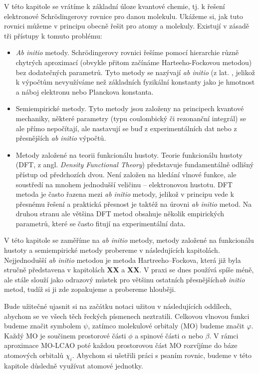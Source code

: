 V této kapitole se vrátíme k základní úloze kvantové chemie, tj. k řešení elektronové Schr\"{o}dingerovy rovnice pro danou molekulu. Ukážeme si, jak tuto rovnici můžeme v principu obecně řešit pro atomy a molekuly.  Existují v zásadě tři přístupy k tomuto problému:

\begin{itemize}

\item \textit{Ab initio} metody.  Schr\"{o}dingerovy  rovnici řešíme pomocí hierarchie různě chytrých aproximací (obvykle přitom začínáme Harteeho-Fockovou metodou) bez dodatečných parametrů. Tyto metody se nazývají \textit{ab initio} (z lat. , jelikož k výpočtům nevyužíváme než základních fyzikální konstanty jako je hmotnost a náboj elektronu nebo Planckova konstanta. 

\item Semiempirické metody. Tyto metody jsou založeny na principech kvantové mechaniky, některé parametry (typu coulombický či rezonanční integrál) se ale přímo nepočítají, ale nastavují se buď z experimentálních dat nebo z přesnějších \textit{ab initio} výpočtů.

\item Metody založené na teorii funkcionálu hustoty.  Teorie funkcionálu hustoty (DFT, z angl. \textit{Density Functional Theory}) představuje fundamentálně odlišný přístup od předchozích dvou. Není založen na hledání vlnové funkce, ale soustředí na mnohem jednodušší veličinu -- elektronovou hustotu. DFT metoda je často řazena mezi \textit{ab initio} metody, jelikož v principu vede k přesnému řešení a praktická přesnost je taktéž na úrovni \textit{ab initio} metod. Na druhou stranu ale většina DFT metod obsahuje několik empirických parametrů, které se často fitují na experimentální data.    

\end{itemize}

V této kapitole se zaměříme na \textit{ab initio} metody, metody založené na funkcionálu hustoty a semiempirické metody probereme v následujících kapitolách. Nejjednodušší \textit{ab initio} metodou je metoda Hartreeho--Fockova, která již byla stručně představena v kapitolách \textbf{XX} a \textbf{XX}. V praxi se dnes používá spíše méně, ale stále slouží jako odrazový můstek pro většinu ostatních přesnějších\textit{ab initio} metod, tudíž si ji zde zopakujeme a probereme hlouběji.

Bude užitečné ujasnit si na začátku notaci užitou v následujících oddílech, abychom se ve všech těch řeckých písmenech neztratili. Celkovou vlnovou funkci budeme značit symbolem $\psi$,  zatímco molekulové orbitaly (MO) budeme značit $\varphi$. Každý MO je součinem prostorové části $\phi$ a spinové části $\alpha$ nebo $\beta$. V rámci aproximace MO-LCAO poté každou prostorovou část MO rozvíjíme do báze atomových orbitalů $\chi_i$. Abychom si ušetřili práci s psaním rovnic, budeme v této kapitole důsledně využívat atomové jednotky.

